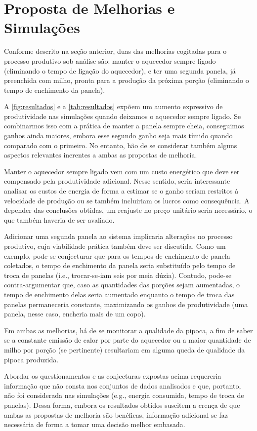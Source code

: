 \documentclass[12pt]{article}
\begin{document}
\section{Proposta de Melhorias e Simulações}
\label{sec:propostas}

Conforme descrito na seção anterior, duas das melhorias cogitadas para o processo produtivo sob análise são: manter o aquecedor sempre ligado (eliminando o tempo de ligação do aquecedor), e ter uma segunda panela, já preenchida com milho, pronta para a produção da próxima porção (eliminando o tempo de enchimento da panela).

A \autoref{fig:resultados} e a \autoref{tab:resultados} expõem um aumento expressivo de produtividade nas simulações quando deixamos o aquecedor sempre ligado. Se combinarmos isso com a prática de manter a panela sempre cheia, conseguimos ganhos ainda maiores, embora esse segundo ganho seja mais tímido quando comparado com o primeiro. No entanto, hão de se considerar também alguns aspectos relevantes inerentes a ambas as propostas de melhoria.

Manter o aquecedor sempre ligado vem com um custo energético que deve ser compensado pela produtividade adicional. Nesse sentido, seria interessante analisar os custos de energia de forma a estimar se o ganho seriam restritos à velocidade de produção ou se também incluiriam os lucros como consequência. A depender das conclusões obtidas, um reajuste no preço unitário seria necessário, o que também haveria de ser avaliado.

Adicionar uma segunda panela ao sistema implicaria alterações no processo produtivo, cuja viabilidade prática também deve ser discutida. Como um exemplo, pode-se conjecturar que para os tempos de enchimento de panela coletados, o tempo de enchimento da panela seria substituído pelo tempo de troca de panelas (i.e., trocar-se-iam seis por meia dúzia). Contudo, pode-se contra-argumentar que, caso as quantidades das porções sejam aumentadas, o tempo de enchimento delas seria aumentado enquanto o tempo de troca das panelas permaneceria constante, maximizando os ganhos de produtividade (uma panela, nesse caso, encheria mais de um copo).

Em ambas as melhorias, há de se monitorar a qualidade da pipoca, a fim de saber se a constante emissão de calor por parte do aquecedor ou a maior quantidade de milho por porção (se pertinente) resultariam em alguma queda de qualidade da pipoca produzida.

Abordar os questionamentos e as conjecturas expostas acima requereria informação que não consta nos conjuntos de dados analisados e que, portanto, não foi considerada nas simulações (e.g., energia consumida, tempo de troca de panelas). Dessa forma, embora os resultados obtidos suscitem a crença de que ambas as propostas de melhoria são benéficas, informação adicional se faz necessária de forma a tomar uma decisão melhor embasada.
\end{document}
